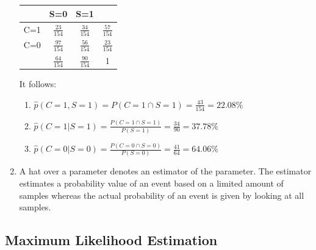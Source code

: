 \documentclass[12pt]{article}
\begin{document}
\begin{enumerate}
\begin{table}[h!]
		\begin{tabular}{|c|c|c|c|}
			\toprule
			& S=0   & S=1   &  \\
			\midrule
			C=1   & $\frac{23}{154}$    & $\frac{34}{154}$    & $\frac{57}{154}$  \\
			\midrule
			C=0   & $\frac{97}{154}$    & $\frac{56}{154}$    & $\frac{23}{154}$  \\
			\midrule
			& $\frac{64}{154}$  & $\frac{90}{154}$  & 1 \\
			\bottomrule
		\end{tabular}%
	\end{table}%
	It follows:
	\begin{enumerate}[label=(\alph*)]
		\item $\hat{p}(C=1,S=1)=P(C=1\cap S=1)=\frac{43}{154}=22.08\%$
		\item $\hat{p}(C=1|S=1)=\frac{P(C=1\cap S=1)}{P(S=1)}=\frac{34}{90}=37.78\%$
		\item $\hat{p}(C=0|S=0)=\frac{P(C=0\cap S=0)}{P(S=0)}=\frac{41}{64}=64.06\%$
	\end{enumerate}
	\item A hat over a parameter denotes an estimator of the parameter. The estimator estimates a probability value of an event based on a limited amount of samples whereas the actual probability of an event is given by looking at all samples.    
\end{enumerate}

\subsection{Maximum Likelihood Estimation}
\end{document}
